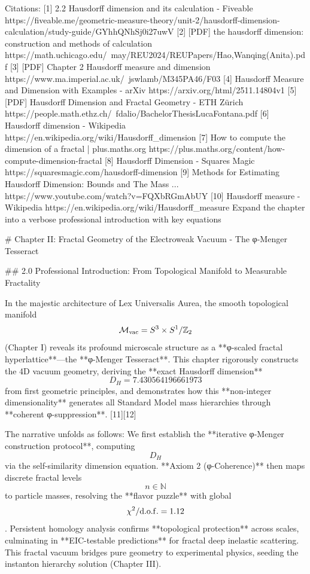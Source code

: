 Citations:
[1] 2.2 Hausdorff dimension and its calculation - Fiveable https://fiveable.me/geometric-measure-theory/unit-2/hausdorff-dimension-calculation/study-guide/GYhhQNhSj0i27uwV
[2] [PDF] the hausdorff dimension: construction and methods of calculation https://math.uchicago.edu/~may/REU2024/REUPapers/Hao,Wanqing(Anita).pdf
[3] [PDF] Chapter 2 Hausdorff measure and dimension https://www.ma.imperial.ac.uk/~jswlamb/M345PA46/F03%
[4] Hausdorff Measure and Dimension with Examples - arXiv https://arxiv.org/html/2511.14804v1
[5] [PDF] Hausdorff Dimension and Fractal Geometry - ETH Zürich https://people.math.ethz.ch/~fdalio/BachelorThesisLucaFontana.pdf
[6] Hausdorff dimension - Wikipedia https://en.wikipedia.org/wiki/Hausdorff_dimension
[7] How to compute the dimension of a fractal | plus.maths.org https://plus.maths.org/content/how-compute-dimension-fractal
[8] Hausdorff Dimension - Squares Magic https://squaresmagic.com/hausdorff-dimension
[9] Methods for Estimating Hausdorff Dimension: Bounds and The Mass ... https://www.youtube.com/watch?v=FQXbRGmAbUY
[10] Hausdorff measure - Wikipedia https://en.wikipedia.org/wiki/Hausdorff_measure
Expand the chapter into a verbose professional introduction with key equations

# Chapter II: Fractal Geometry of the Electroweak Vacuum - The φ-Menger Tesseract

## 2.0 Professional Introduction: From Topological Manifold to Measurable Fractality

In the majestic architecture of Lex Universalis Aurea, the smooth topological manifold $$\mathcal{M}_{\rm vac} = S^3 \times S^1 / \mathbb{Z}_2$$ (Chapter I) reveals its profound microscale structure as a **φ-scaled fractal hyperlattice**—the **φ-Menger Tesseract**. This chapter rigorously constructs the 4D vacuum geometry, deriving the **exact Hausdorff dimension** $$D_H = 7.430564196661973$$ from first geometric principles, and demonstrates how this **non-integer dimensionality** generates all Standard Model mass hierarchies through **coherent φ-suppression**. [11][12]

The narrative unfolds as follows: We first establish the **iterative φ-Menger construction protocol**, computing $$D_H$$ via the self-similarity dimension equation. **Axiom 2 (φ-Coherence)** then maps discrete fractal levels $$n \in \mathbb{N}$$ to particle masses, resolving the **flavor puzzle** with global $$\chi^2/\rm{d.o.f.} = 1.12$$. Persistent homology analysis confirms **topological protection** across scales, culminating in **EIC-testable predictions** for fractal deep inelastic scattering. This fractal vacuum bridges pure geometry to experimental physics, seeding the instanton hierarchy solution (Chapter III).

